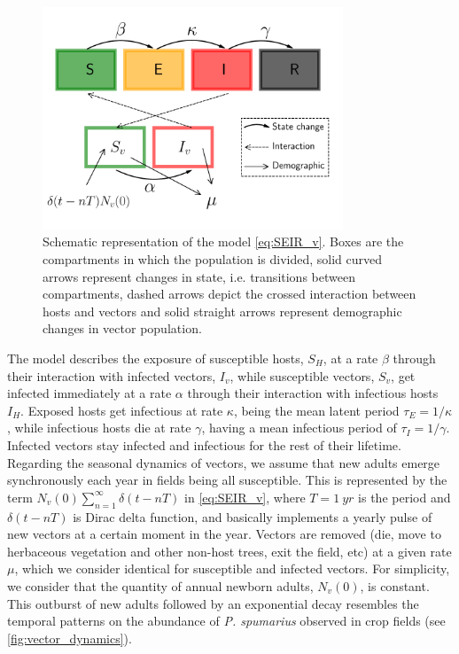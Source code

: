 \begin{figure}
    \centering
    \label{fig:model_diagram_phyto}
    \includegraphics[width=0.8\textwidth]{Figures/SEIR_v_scheme.pdf}
    \caption[Schematic representation of the model]{Schematic representation of
        the model \cref{eq:SEIR_v}. Boxes
        are the compartments in which the population is divided, solid curved
        arrows
        represent changes in state, i.e. transitions between compartments,
        dashed
        arrows depict the crossed interaction between hosts and vectors and
        solid
        straight arrows represent demographic changes in vector population.}
\end{figure}

The model describes the exposure of susceptible hosts, $S_H$, at a rate
$\beta$ through their interaction with infected vectors, $I_v$, while
susceptible vectors, $S_v$, get infected immediately at a rate $\alpha$ through
their interaction with infectious hosts $I_H$. Exposed hosts get infectious at
rate $\kappa$, being the mean latent period $\tau_E=1/\kappa$, while infectious
hosts die at rate $\gamma$, having a mean infectious period of
$\tau_I=1/\gamma$. Infected vectors stay infected and infectious for the rest
of their lifetime. Regarding the seasonal dynamics of vectors, we assume that
new adults emerge synchronously each year in fields being all susceptible. This
is represented by the term $N_v(0)\sum_{n=1}^{\infty}\delta(t-nT)$ in
\cref{eq:SEIR_v}, where $T=\SI{1}{yr}$ is the period and $\delta(t-nT)$ is
Dirac delta function, and basically implements a yearly pulse of new vectors at
a certain moment in the year. Vectors are removed (die, move to herbaceous
vegetation and other non-host trees, exit the field, etc) at a given rate
$\mu$, which we consider identical for susceptible and infected vectors. For
simplicity, we consider that the quantity of annual newborn adults, $N_v(0)$,
is constant. This outburst of new adults followed by an exponential decay
resembles the temporal patterns on the abundance of \textit{P. spumarius}
observed in crop fields  \cite{Antonatos2021,Beal2021,Cornara2017,Lopez2021}
(see \cref{fig:vector_dynamics}).

